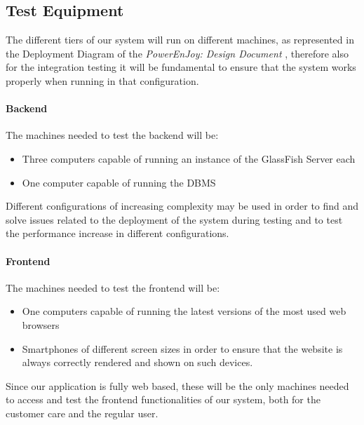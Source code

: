 \subsection{Test Equipment}
The different tiers of our system will run on different machines, as represented in the Deployment Diagram of the \emph{PowerEnJoy: Design Document} \cite{DD}, therefore also for the integration testing it will be fundamental to ensure that the system works properly when running in that configuration.
\paragraph{Backend}
The machines needed to test the backend will be:
\begin{itemize}
	\item Three computers capable of running an instance of the GlassFish Server each
	\item One computer capable of running the DBMS
\end{itemize}
Different configurations of increasing complexity may be used in order to find and solve issues related to the deployment of the system during testing and to test the performance increase in different configurations.
\paragraph{Frontend}
The machines needed to test the frontend will be:
\begin{itemize}
	\item One computers capable of running the latest versions of the most used web browsers
	\item Smartphones of different screen sizes in order to ensure that the website is always correctly rendered and shown on such devices.
\end{itemize}
Since our application is fully web based, these will be the only machines needed to access and test the frontend functionalities of our system, both for the customer care and the regular user.

